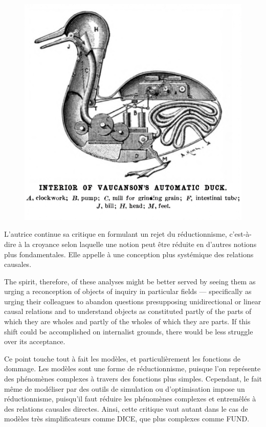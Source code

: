 \begin{figure}
    \centering
    \includegraphics[width=0.75\linewidth]{reductionisme.png}
    \label{fig:reductionnisme}
\end{figure}

\begin{displayquote}
    
\end{displayquote}

L'autrice continue sa critique en formulant un rejet du réductionnisme, c'est-à-dire à la croyance selon laquelle une notion peut être réduite en d'autres notions plus fondamentales. Elle appelle à une conception plus systémique des relations causales. 

\begin{displayquote}
    The spirit, therefore, of these analyses might be better served by seeing them as urging a reconception of objects of inquiry in particular fields — specifically as urging their colleagues to abandon questions presupposing unidirectional or linear causal relations and to understand objects as constituted partly of the parts of which they are wholes and partly of the wholes of which they are parts. If this shift could be accomplished on internalist grounds, there would be less struggle over its acceptance.
\end{displayquote}

Ce point touche tout à fait les modèles, et particulièrement les fonctions de dommage. Les modèles sont une forme de réductionnisme, puisque l'on représente des phénomènes complexes à travers des fonctions plus simples. Cependant, le fait même de modéliser par des outils de simulation ou d'optimisation impose un réductionnisme, puisqu'il faut réduire les phénomènes complexes et entremêlés à des relations causales directes. Ainsi, cette critique vaut autant dans le cas de modèles très simplificateurs comme DICE, que plus complexes comme FUND.   \\


